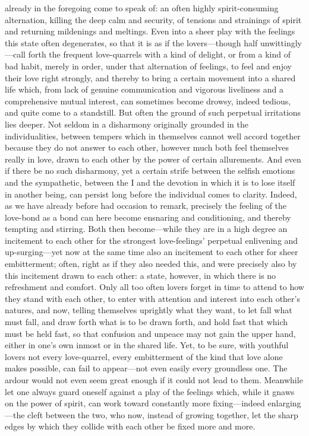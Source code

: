 \documentclass[12pt,a4paper]{book}
\begin{document}
already in the foregoing come to speak of: an often highly spirit-consuming
alternation, killing the deep calm and security, of tensions and strainings
of spirit and returning mildenings and meltings. Even into a sheer play
with the feelings this state often degenerates, so that it is as if the
lovers---though half unwittingly---call forth the frequent love-quarrels
with a kind of delight, or from a kind of bad habit, merely in order, under
that alternation of feelings, to feel and enjoy their love right strongly,
and thereby to bring a certain movement into a shared life which, from lack
of genuine communication and vigorous liveliness and a comprehensive mutual
interest, can sometimes become drowsy, indeed tedious, and quite come to a
standstill. But often the ground of such perpetual irritations lies deeper.
Not seldom in a disharmony originally grounded in the individualities,
between tempers which in themselves cannot well accord together because they
do not answer to each other, however much both feel themselves really in
love, drawn to each other by the power of certain allurements. And even if
there be no such disharmony, yet a certain strife between the selfish
emotions and the sympathetic, between the I and the devotion in which it is
to lose itself in another being, can persist long before the individual
comes to clarity. Indeed, as we have already before had occasion to remark,
precisely the feeling of the love-bond as a bond can here become ensnaring
and conditioning, and thereby tempting and stirring. Both then
become---while they are in a high degree an incitement to each other for the
strongest love-feelings' perpetual enlivening and up-surging---yet now at
the same time also an incitement to each other for sheer embitterment;
often, right as if they also needed this, and were precisely also by this
incitement drawn to each other: a state, however, in which there is no
refreshment and comfort. Only all too often lovers forget in time to attend
to how they stand with each other, to enter with attention and interest
into each other's natures, and now, telling themselves uprightly what they
want, to let fall what must fall, and draw forth what is to be drawn forth,
and hold fast that which must be held fast, so that confusion and unpeace
may not gain the upper hand, either in one's own inmost or in the shared
life. Yet, to be sure, with youthful lovers not every love-quarrel, every
embitterment of the kind that love alone makes possible, can fail to
appear---not even easily every groundless one. The ardour would not even
seem great enough if it could not lead to them. Meanwhile let one always
guard oneself against a play of the feelings which, while it gnaws on the
power of spirit, can work toward constantly more fixing---indeed
enlarging---the cleft between the two, who now, instead of growing together,
let the sharp edges by which they collide with each other be fixed more and
more.
\end{document}

